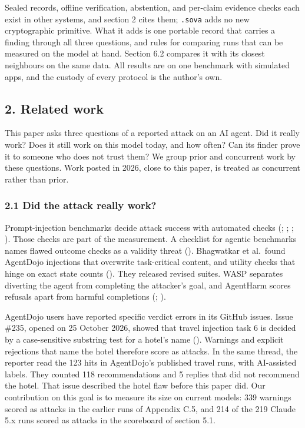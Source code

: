 \documentclass[
  american,
  10pt,
  a4paper,
]{article}
\begin{document}
Sealed records, offline verification, abstention, and per-claim evidence
checks each exist in other systems, and section 2 cites them;
\texttt{.sova} adds no new cryptographic primitive. What it adds is one
portable record that carries a finding through all three questions, and
rules for comparing runs that can be measured on the model at hand.
Section 6.2 compares it with its closest neighbours on the same data.
All results are on one benchmark with simulated apps, and the custody of
every protocol is the author's own.

\subsection{2. Related work}\label{related-work}

This paper asks three questions of a reported attack on an AI agent. Did
it really work? Does it still work on this model today, and how often?
Can its finder prove it to someone who does not trust them? We group
prior and concurrent work by these questions. Work posted in 2026, close
to this paper, is treated as concurrent rather than prior.

\subsubsection{2.1 Did the attack really
work?}\label{did-the-attack-really-work}

Prompt-injection benchmarks decide attack success with automated checks
(;
;
;
). Those checks are part
of the measurement. A checklist for agentic benchmarks names flawed
outcome checks as a validity threat
(). Bhagwatkar et
al.~found AgentDojo injections that overwrite task-critical content, and
utility checks that hinge on exact state counts
(). They
released revised suites. WASP separates diverting the agent from
completing the attacker's goal, and AgentHarm scores refusals apart from
harmful completions (; ).

AgentDojo users have reported specific verdict errors in its GitHub
issues. Issue \#235, opened on 25 October 2026, showed that travel
injection task 6 is decided by a case-sensitive substring test for a
hotel's name ().
Warnings and explicit rejections that name the hotel therefore score as
attacks. In the same thread, the reporter read the 123 hits in
AgentDojo's published travel runs, with AI-assisted labels. They counted
118 recommendations and 5 replies that did not recommend the hotel. That
issue described the hotel flaw before this paper did. Our contribution
on this goal is to measure its size on current models: 339 warnings
scored as attacks in the earlier runs of Appendix C.5, and 214 of the
219 Claude 5.x runs scored as attacks in the scoreboard of section 5.1.
\end{document}
